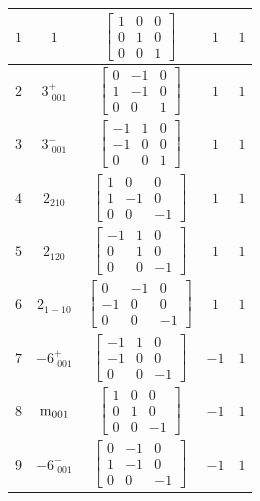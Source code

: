 \documentclass[fleqn,8pt]{jsarticle}
\begin{document}
\begin{longtable}{ccccc}
$ 1 $ & $ 1 $ & $ \begin{bmatrix} 1 & 0 & 0 \\ 0 & 1 & 0 \\ 0 & 0 & 1 \end{bmatrix} $ & $ 1 $ & $ 1 $ \\ \hline
$ 2 $ & $ 3^{+}_{\,\,001} $ & $ \begin{bmatrix} 0 & -1 & 0 \\ 1 & -1 & 0 \\ 0 & 0 & 1 \end{bmatrix} $ & $ 1 $ & $ 1 $ \\ \hline
$ 3 $ & $ 3^{-}_{\,\,001} $ & $ \begin{bmatrix} -1 & 1 & 0 \\ -1 & 0 & 0 \\ 0 & 0 & 1 \end{bmatrix} $ & $ 1 $ & $ 1 $ \\ \hline
$ 4 $ & $ 2{}_{210} $ & $ \begin{bmatrix} 1 & 0 & 0 \\ 1 & -1 & 0 \\ 0 & 0 & -1 \end{bmatrix} $ & $ 1 $ & $ 1 $ \\ \hline
$ 5 $ & $ 2{}_{120} $ & $ \begin{bmatrix} -1 & 1 & 0 \\ 0 & 1 & 0 \\ 0 & 0 & -1 \end{bmatrix} $ & $ 1 $ & $ 1 $ \\ \hline
$ 6 $ & $ 2{}_{1-10} $ & $ \begin{bmatrix} 0 & -1 & 0 \\ -1 & 0 & 0 \\ 0 & 0 & -1 \end{bmatrix} $ & $ 1 $ & $ 1 $ \\ \hline
$ 7 $ & $ -6^{+}_{\,\,001} $ & $ \begin{bmatrix} -1 & 1 & 0 \\ -1 & 0 & 0 \\ 0 & 0 & -1 \end{bmatrix} $ & $ -1 $ & $ 1 $ \\ \hline
$ 8 $ & $ {\rm m}_{001} $ & $ \begin{bmatrix} 1 & 0 & 0 \\ 0 & 1 & 0 \\ 0 & 0 & -1 \end{bmatrix} $ & $ -1 $ & $ 1 $ \\ \hline
$ 9 $ & $ -6^{-}_{\,\,001} $ & $ \begin{bmatrix} 0 & -1 & 0 \\ 1 & -1 & 0 \\ 0 & 0 & -1 \end{bmatrix} $ & $ -1 $ & $ 1 $ \\ \hline

\end{longtable}
\end{document}
